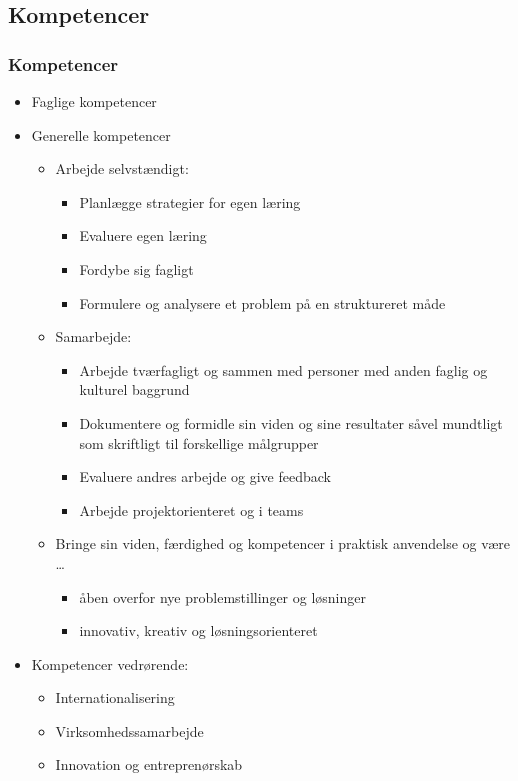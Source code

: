 {\subsection{Kompetencer}
\begin{frame}[fragile]
  \frametitle{Kompetencer}
  \vspace{-3mm}
  \begin{itemize}
    \pause
    \item Faglige kompetencer
    \pause
    \item Generelle kompetencer
      \begin{itemize}
        \pause
        \item Arbejde selvstændigt:
          \begin{itemize}
            \item Planlægge strategier for egen læring
            \item Evaluere egen læring
            \item Fordybe sig fagligt
            \item Formulere og analysere et problem på en struktureret måde
          \end{itemize}
        \pause
        \item Samarbejde:
          \begin{itemize}
            \item Arbejde tværfagligt og sammen med personer med anden faglig og kulturel
baggrund
            \item Dokumentere og formidle sin viden og sine resultater såvel
mundtligt som skriftligt til forskellige målgrupper
            \item Evaluere andres arbejde og give feedback
            \item Arbejde projektorienteret og i teams
          \end{itemize}
        \pause
        \item Bringe sin viden, færdighed og kompetencer i praktisk anvendelse og være \ldots
          \begin{itemize}
            \item åben overfor nye problemstillinger og løsninger
            \item innovativ, kreativ og løsningsorienteret
          \end{itemize}
      \end{itemize}
    \pause
    \item Kompetencer vedrørende:
      \begin{itemize}
        \item Internationalisering
        \item Virksomhedssamarbejde
        \item Innovation og entreprenørskab
      \end{itemize}
  \end{itemize}
\end{frame}

}
